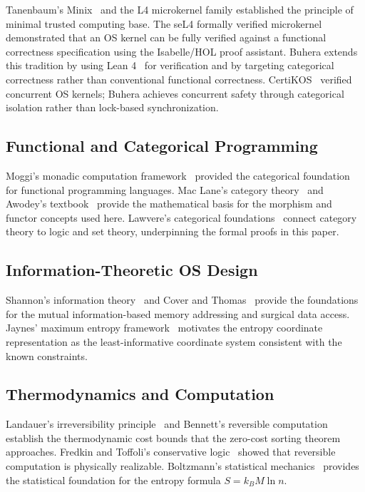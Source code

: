 \documentclass[12pt,twocolumn]{article}
\begin{document}
Tanenbaum's Minix~\cite{tanenbaum2015modern} and the L4 microkernel family established the principle of minimal trusted computing base. The seL4 formally verified microkernel~\cite{klein2009sel4} demonstrated that an OS kernel can be fully verified against a functional correctness specification using the Isabelle/HOL proof assistant. Buhera extends this tradition by using Lean 4~\cite{moura2021lean4} for verification and by targeting categorical correctness rather than conventional functional correctness. CertiKOS~\cite{hicks2016certikos} verified concurrent OS kernels; Buhera achieves concurrent safety through categorical isolation rather than lock-based synchronization.

\subsection{Functional and Categorical Programming}

Moggi's monadic computation framework~\cite{moggi1991notions} provided the categorical foundation for functional programming languages. Mac Lane's category theory~\cite{maclane1998categories} and Awodey's textbook~\cite{awodey2010category} provide the mathematical basis for the morphism and functor concepts used here. Lawvere's categorical foundations~\cite{lawvere2003sets} connect category theory to logic and set theory, underpinning the formal proofs in this paper.

\subsection{Information-Theoretic OS Design}

Shannon's information theory~\cite{shannon1949mathematical} and Cover and Thomas~\cite{cover2006elements} provide the foundations for the mutual information-based memory addressing and surgical data access. Jaynes' maximum entropy framework~\cite{jaynes1957information} motivates the entropy coordinate representation as the least-informative coordinate system consistent with the known constraints.

\subsection{Thermodynamics and Computation}

Landauer's irreversibility principle~\cite{landauer1961irreversibility} and Bennett's reversible computation~\cite{bennett1973logical} establish the thermodynamic cost bounds that the zero-cost sorting theorem approaches. Fredkin and Toffoli's conservative logic~\cite{fredkin1982conservative} showed that reversible computation is physically realizable. Boltzmann's statistical mechanics~\cite{boltzmann1896vorlesungen} provides the statistical foundation for the entropy formula $S = k_B M \ln n$.
\end{document}
